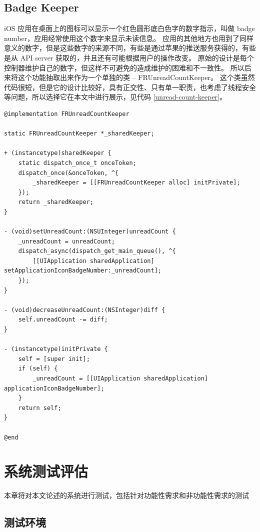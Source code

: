 \section{Badge Keeper}

iOS 应用在桌面上的图标可以显示一个红色圆形底白色字的数字指示，叫做 badge number，应用经常使用这个数字来显示未读信息。
应用的其他地方也用到了同样意义的数字，但是这些数字的来源不同，有些是通过苹果的推送服务获得的，有些是从 API server 获取的，并且还有可能根据用户的操作改变。
原始的设计是每个控制器维护自己的数字，但这样不可避免的造成维护的困难和不一致性。
所以后来将这个功能抽取出来作为一个单独的类 -- FRUnreadCountKeeper。
这个类虽然代码很短，但是它的设计比较好，具有正交性、只有单一职责，也考虑了线程安全等问题，所以选择它在本文中进行展示，见代码 \ref{unread-count-keeper}。

\begin{minipage}{\textwidth}
\begin{lstlisting}[caption=FRUnreadCountKeeper 的实现, label=unread-count-keeper]
@implementation FRUnreadCountKeeper

static FRUnreadCountKeeper *_sharedKeeper;

+ (instancetype)sharedKeeper {
    static dispatch_once_t onceToken;
    dispatch_once(&onceToken, ^{
        _sharedKeeper = [[FRUnreadCountKeeper alloc] initPrivate];
    });
    return _sharedKeeper;
}

- (void)setUnreadCount:(NSUInteger)unreadCount {
    _unreadCount = unreadCount;
    dispatch_async(dispatch_get_main_queue(), ^{
        [[UIApplication sharedApplication] setApplicationIconBadgeNumber:_unreadCount];
    });
}

- (void)decreaseUnreadCount:(NSInteger)diff {
    self.unreadCount -= diff;
}

- (instancetype)initPrivate {
    self = [super init];
    if (self) {
        _unreadCount = [[UIApplication sharedApplication] applicationIconBadgeNumber];
    }
    return self;
}

@end
\end{lstlisting}
\end{minipage}

\chapter{系统测试评估}
\label{test}

本章将对本文论述的系统进行测试，包括针对功能性需求和非功能性需求的测试

\section{测试环境}

